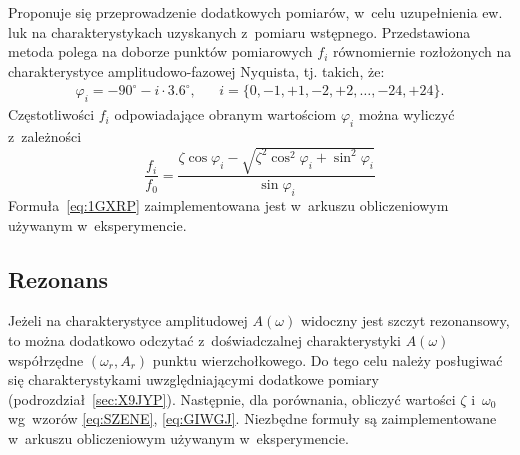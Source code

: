 \documentclass[paper=a4,DIV=12]{lpas}
\newcommand{\degree}{^{\circ}}
\begin{document}
\begin{appendices}
  Proponuje się przeprowadzenie dodatkowych pomiarów, w~celu uzupełnienia ew. luk
  na charakterystykach uzyskanych z~pomiaru wstępnego. Przedstawiona metoda
  polega na doborze punktów pomiarowych $f_i$ równomiernie rozłożonych na
  charakterystyce amplitudowo-fazowej Nyquista, tj. takich, że:
  \begin{equation}
    \begin{aligned}
      & \varphi_i = -90\degree - i \cdot 3.6\degree, && i=\{0, -1,+1,-2,+2,\dots,-24,+24\}. &
    \end{aligned}
  \end{equation}
  Częstotliwości $f_i$ odpowiadające obranym wartościom $\varphi_i$ można
  wyliczyć z~zależności
  \begin{equation}
    \frac{f_i}{f_0} = \frac{
      \zeta\cos{\varphi_i} - \sqrt{\zeta^2\cos^2{\varphi_i} + \sin^2{\varphi_i}}
    }{
      \sin{\varphi_i}
    }
    \label{eq:1GXRP}
  \end{equation}
  Formuła~\eqref{eq:1GXRP} zaimplementowana jest w~arkuszu obliczeniowym
  używanym w~eksperymencie.

  \subsection{Rezonans}
  \label{sec:U6GVM}

  Jeżeli na charakterystyce amplitudowej $A(\omega)$ widoczny jest szczyt
  rezonansowy, to można dodatkowo odczytać z~doświadczalnej charakterystyki
  $A(\omega)$ współrzędne $(\omega_r, A_r)$ punktu wierzchołkowego. Do tego
  celu należy posługiwać się charakterystykami uwzględniającymi dodatkowe
  pomiary (podrozdział~\ref{sec:X9JYP}). Następnie, dla porównania, obliczyć
  wartości $\zeta$ i~$\omega_0$ wg~wzorów \eqref{eq:SZENE}, \eqref{eq:GIWGJ}.
  Niezbędne formuły są zaimplementowane w~arkuszu obliczeniowym używanym
  w~eksperymencie.

\end{appendices}

\end{document}
